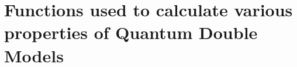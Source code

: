 
\chapter{Functions used to calculate various properties of Quantum Double Models} %

\label{AppendixA} %



